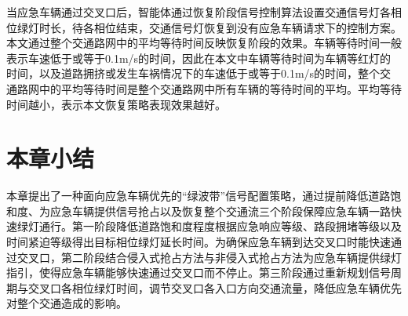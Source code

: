 当应急车辆通过交叉口后，智能体通过恢复阶段信号控制算法设置交通信号灯各相位绿灯时长，待各相位结束，交通信号灯恢复到没有应急车辆请求下的控制方案。本文通过整个交通路网中的平均等待时间反映恢复阶段的效果。车辆等待时间一般表示车速低于或等于0.1m/s的时间，因此在本文中车辆等待时间为车辆等红灯的时间，以及道路拥挤或发生车祸情况下的车速低于或等于0.1m/s的时间，整个交通路网中的平均等待时间是整个交通路网中所有车辆的等待时间的平均。平均等待时间越小，表示本文恢复策略表现效果越好。

\section{本章小结}
本章提出了一种面向应急车辆优先的“绿波带”信号配置策略，通过提前降低道路饱和度、为应急车辆提供信号抢占以及恢复整个交通流三个阶段保障应急车辆一路快速绿灯通行。第一阶段降低道路饱和度程度根据应急响应等级、路段拥堵等级以及时间紧迫等级得出目标相位绿灯延长时间。为确保应急车辆到达交叉口时能快速通过交叉口，第二阶段结合侵入式抢占方法与非侵入式抢占方法为应急车辆提供绿灯指引，使得应急车辆能够快速通过交叉口而不停止。第三阶段通过重新规划信号周期与交叉口各相位绿灯时间，调节交叉口各入口方向交通流量，降低应急车辆优先对整个交通造成的影响。
